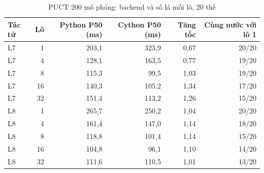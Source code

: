 \begin{table}[H]
  \centering
  \footnotesize
  \caption{PUCT 200 mô phỏng: backend và số lá mỗi lô, 20 thế}
  \label{tab:cs-tk-backend-puct}
  \begin{tabular}{lrrrrr}
    \toprule
    Tác tử & Lô & Python P50 (ms) & Cython P50 (ms) & Tăng tốc & Cùng nước với lô 1 \\
    \midrule
    L7 & 1 & 203,1 & 323,9 & 0,67 & 20/20 \\
    L7 & 4 & 128,1 & 163,5 & 0,77 & 19/20 \\
    L7 & 8 & 115,3 & 99,5 & 1,03 & 19/20 \\
    L7 & 16 & 140,3 & 105,2 & 1,34 & 17/20 \\
    L7 & 32 & 151,4 & 113,2 & 1,26 & 15/20 \\
    \midrule
    L8 & 1 & 265,7 & 250,2 & 1,04 & 20/20 \\
    L8 & 4 & 161,4 & 147,0 & 1,14 & 18/20 \\
    L8 & 8 & 118,8 & 101,4 & 1,14 & 15/20 \\
    L8 & 16 & 104,8 & 96,1 & 1,10 & 14/20 \\
    L8 & 32 & 111,6 & 110,5 & 1,01 & 13/20 \\
    \bottomrule
  \end{tabular}
\end{table}
